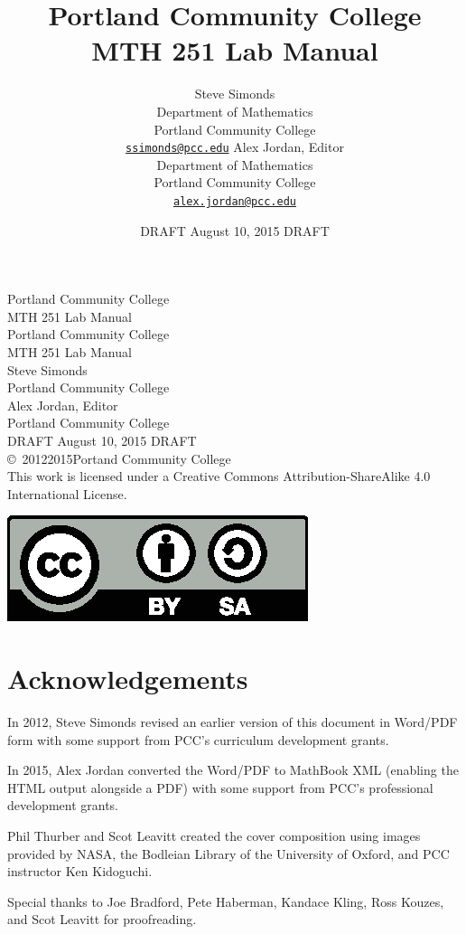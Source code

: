 \documentclass[10pt,oneside,]{book}
\title{Portland Community College \\MTH 251 Lab Manual}
\author{Steve Simonds\\
Department of Mathematics\\
Portland Community College\\
\href{mailto:ssimonds@pcc.edu}{\nolinkurl{ssimonds@pcc.edu}}
Alex Jordan, Editor\\
Department of Mathematics\\
Portland Community College\\
\href{mailto:alex.jordan@pcc.edu}{\nolinkurl{alex.jordan@pcc.edu}}
}
\date{DRAFT August 10, 2015 DRAFT}
\theoremstyle{plain}
\theoremstyle{definition}
\numberwithin{equation}{section}
\begin{document}
\frontmatter
\thispagestyle{empty}
{\centering
\vspace*{0.28\textheight}
{\Huge Portland Community College \\MTH 251 Lab Manual}\\}
\clearpage
\thispagestyle{empty}
\null%
\clearpage
\thispagestyle{empty}
{\centering
\vspace*{0.14\textheight}
{\Huge Portland Community College \\MTH 251 Lab Manual}\\[3\baselineskip]
{\Large Steve Simonds}\\[0.5\baselineskip]
{\Large Portland Community College}\\[3\baselineskip]
{\Large Alex Jordan, Editor}\\[0.5\baselineskip]
{\Large Portland Community College}\\[3\baselineskip]
{\Large DRAFT August 10, 2015 DRAFT}\\}
\clearpage
\thispagestyle{empty}
\noindent\copyright\ 2012\textendash{}2015\quad{}Portand Community College\\[0.5\baselineskip]
This work is licensed under a Creative Commons Attribution-ShareAlike 4.0 International License.%

            \par
\includegraphics[]{../images/by-sa.eps}%
\par
{}
\null\clearpage
\chapter*{Acknowledgements}\label{acknowledgement-1}
In 2012, Steve Simonds revised an earlier version of this document in Word/PDF form with some support from PCC's curriculum development grants.%
\par
In 2015, Alex Jordan converted the Word/PDF to MathBook XML (enabling the HTML output alongside a PDF) with some support from PCC's professional development grants.%
\par
Phil Thurber and Scot Leavitt created the cover composition using images provided by NASA, the Bodleian Library of the University of Oxford, and PCC instructor Ken Kidoguchi.%
\par
Special thanks to Joe Bradford, Pete Haberman, Kandace Kling, Ross Kouzes, and Scot Leavitt for proofreading.%
\end{document}
